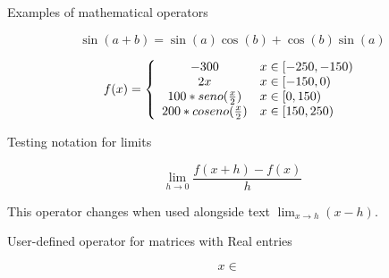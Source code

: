 \documentclass{article}
\DeclareMathOperator{\Mr}{M_{\mathbb{R}}}
\begin{document}
Examples of mathematical operators

\[
\sin(a + b ) = \sin(a)\cos(b) + \cos(b)\sin(a)
\]

$$ 
f(x) = \left\{
\begin{array}{c l}
 -300 & x \in [-250,-150)\\
 2x & x \in [-150,0)\\
 100*seno(\frac{x}{2}) & x \in [0,150)\\
 200*coseno(\frac{x}{2}) & x \in [150,250)
\end{array}
\right.
$$

\vspace{1cm}

Testing notation for limits

\[
\lim_{h \rightarrow 0 } \frac{f(x+h)-f(x)}{h}
\]

This operator changes when used alongside 
text \( \lim_{x \rightarrow h} (x-h) \).

\vspace{1cm}

User-defined operator for matrices with Real entries

\[
x \in \Mr
\]
\end{document}
